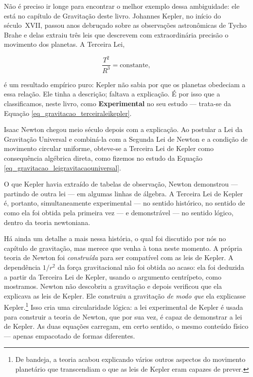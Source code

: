 Não é preciso ir longe para encontrar o melhor exemplo dessa
ambiguidade: ele está no capítulo de Gravitação deste livro. Johannes Kepler, no início do século~XVII, passou anos debruçado sobre
as observações astronômicas de Tycho Brahe e delas extraiu três leis que
descrevem com extraordinária precisão o movimento dos planetas. A
Terceira Lei,

$$ \frac{T^2}{R^3} = \text{constante}, $$

é um resultado empírico puro: Kepler não sabia por que os planetas
obedeciam a essa relação. Ele tinha a descrição; faltava a explicação. 
É por isso que a classificamos, neste livro, como \textbf{Experimental} no seu estudo --- trata-se da Equação \eqref{eq_gravitacao_terceiraleikepler}.

Isaac Newton chegou meio século depois com a explicação. Ao postular a
Lei da Gravitação Universal e combiná-la com a Segunda Lei de Newton e a
condição de movimento circular uniforme, obteve-se a Terceira Lei de
Kepler como consequência algébrica direta, como fizemos no estudo da Equação \eqref{eq_gravitacao_leigravitacaouniversal}.

O que Kepler havia extraído de tabelas de observação, Newton demonstrou --- partindo de outra lei --- em algumas linhas de álgebra. A Terceira Lei de Kepler é, portanto,
simultaneamente experimental --- no sentido histórico, no sentido de
como ela foi obtida pela primeira vez --- e demonstrável --- no sentido
lógico, dentro da teoria newtoniana.

Há ainda um detalhe a mais nessa história, o qual foi discutido por nós no capítulo de gravitação, mas merece que venha à tona neste momento. A própria teoria de Newton
foi \textit{construída} para ser compatível com as leis de Kepler. A
dependência $1/r^2$ da força gravitacional não foi obtida ao acaso: ela foi deduzida a partir da Terceira Lei de Kepler,
usando o argumento centrípeto, como mostramos. Newton não descobriu a gravitação e
depois verificou que ela explicava as leis de Kepler. Ele construiu a gravitação
\textit{de modo que} ela explicasse Kepler.\footnote{De bandeja, a teoria acabou explicando vários outros aspectos do movimento planetário que transcendiam o que as leis de Kepler eram capazes de prever.} Isso cria uma circularidade
lógica: a lei experimental de Kepler é usada para
construir a teoria de Newton, que por sua vez, é capaz de demonstrar a lei de Kepler.
As duas equações carregam, em certo sentido, o mesmo conteúdo físico
--- apenas empacotado de formas diferentes.


